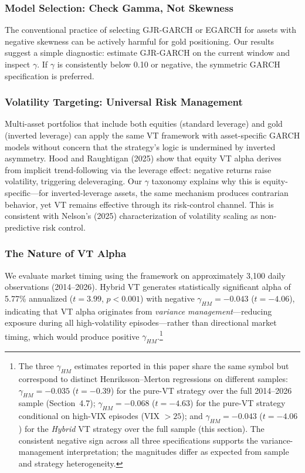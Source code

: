 \subsubsection{Model Selection: Check Gamma, Not Skewness}

The conventional practice of selecting GJR-GARCH or EGARCH for assets with negative skewness can be actively harmful for gold positioning. Our results suggest a simple diagnostic: estimate GJR-GARCH on the current window and inspect $\gamma$. If $\gamma$ is consistently below 0.10 or negative, the symmetric GARCH specification is preferred.

\subsubsection{Volatility Targeting: Universal Risk Management}

Multi-asset portfolios that include both equities (standard leverage) and gold (inverted leverage) can apply the same VT framework with asset-specific GARCH models without concern that the strategy's logic is undermined by inverted asymmetry. Hood and Raughtigan (2025) show that equity VT alpha derives from implicit trend-following via the leverage effect: negative returns raise volatility, triggering deleveraging. Our $\gamma$ taxonomy explains why this is equity-specific---for inverted-leverage assets, the same mechanism produces contrarian behavior, yet VT remains effective through its risk-control channel. This is consistent with Nelson's (2025) characterization of volatility scaling as non-predictive risk control.

\subsubsection{The Nature of VT Alpha}
\label{subsec:vt-alpha-nature}

We evaluate market timing using the \citet{henriksson1981} framework on approximately 3,100 daily observations (2014--2026). Hybrid VT generates statistically significant alpha of 5.77\% annualized ($t = 3.99$, $p < 0.001$) with negative $\gamma_{HM} = -0.043$ ($t = -4.06$), indicating that VT alpha originates from \textit{variance management}---reducing exposure during all high-volatility episodes---rather than directional market timing, which would produce positive $\gamma_{HM}$.\footnote{The three $\gamma_{HM}$ estimates reported in this paper share the same symbol but correspond to distinct Henriksson--Merton regressions on different samples: $\gamma_{HM} = -0.035$ ($t = -0.39$) for the pure-VT strategy over the full 2014--2026 sample (Section~4.7); $\gamma_{HM} = -0.068$ ($t = -4.63$) for the pure-VT strategy conditional on high-VIX episodes (VIX $>25$); and $\gamma_{HM} = -0.043$ ($t = -4.06$) for the \emph{Hybrid} VT strategy over the full sample (this section). The consistent negative sign across all three specifications supports the variance-management interpretation; the magnitudes differ as expected from sample and strategy heterogeneity.}


